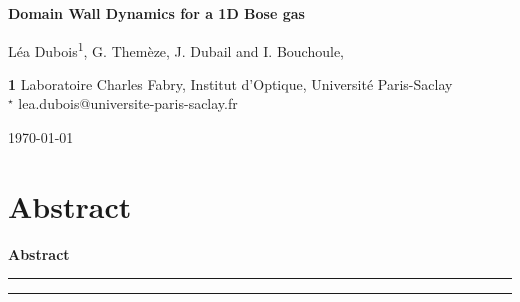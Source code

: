 \documentclass[submission, Phys]{SciPost}
\begin{document}
\begin{center}{\Large \textbf{
Domain Wall Dynamics for a 1D Bose gas\\
}}\end{center}

\begin{center}
Léa Dubois\textsuperscript{1}, G. Themèze, J. Dubail and I. Bouchoule,
\end{center}

\begin{center}
{\bf 1} Laboratoire Charles Fabry, Institut d'Optique, Université Paris-Saclay
\\
${}^\star$ {\small \sf lea.dubois@universite-paris-saclay.fr}
\end{center}

\begin{center}
\today
\end{center}


\section*{Abstract}
{\bf
Abstract
}


\vspace{10pt}
\noindent\rule{\textwidth}{1pt}
\tableofcontents\thispagestyle{fancy}
\noindent\rule{\textwidth}{1pt}
\vspace{10pt}
\end{document}
